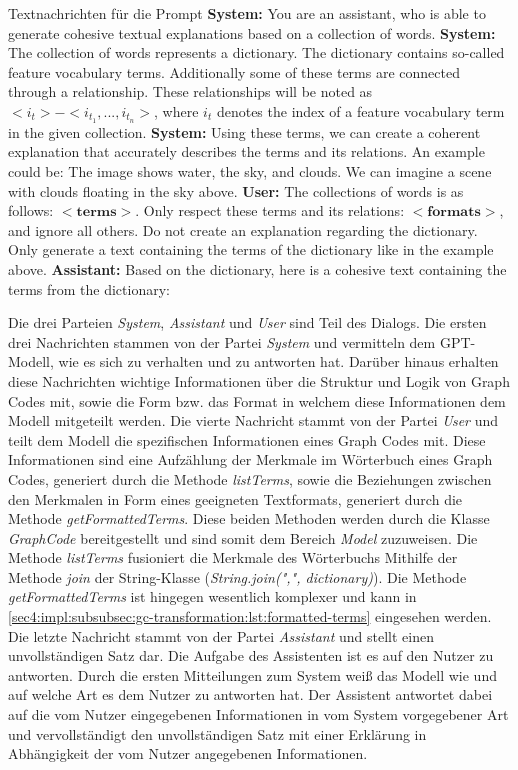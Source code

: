 \begin{messages}[breakable,colbacktitle=white, coltitle=black,label={sec4:impl:subsubsec:gc-transformation:tcb:messages}]{Textnachrichten für die Prompt}
  \textbf{System:} You are an assistant, who is able to generate cohesive textual explanations based on a collection of words.
  \tcbline
  \textbf{System:} The collection of words represents a dictionary.
  The dictionary contains so-called feature vocabulary terms.
  Additionally some of these terms are connected through a relationship.
  These relationships will be noted as $<i_t> - <i_{t_1},...,i_{t_n}>$, where $i_t$ denotes the index of a feature vocabulary term in the given collection.
  \tcbline
  \textbf{System:} Using these terms, we can create a coherent explanation that accurately describes the terms and its relations.
  \med
  An example could be: The image shows water, the sky, and clouds.
  We can imagine a scene with clouds floating in the sky above.
  \tcbline
  \textbf{User:} The collections of words is as follows: $<\textbf{terms}>$.
  Only respect these terms and its relations: $<\textbf{formats}>$, and ignore all others.
  Do not create an explanation regarding the dictionary.
  Only generate a text containing the terms of the dictionary like in the example above.
  \tcbline
  \textbf{Assistant:} Based on the dictionary, here is a cohesive text containing the terms from the dictionary:
\end{messages}

Die drei Parteien \textit{System}, \textit{Assistant} und \textit{User} sind Teil des Dialogs.
Die ersten drei Nachrichten stammen von der Partei \textit{System} und vermitteln dem GPT-Modell, wie es sich zu verhalten und zu antworten hat.
Darüber hinaus erhalten diese Nachrichten wichtige Informationen über die Struktur und Logik von Graph Codes mit, sowie die Form bzw. das Format in welchem diese Informationen dem Modell mitgeteilt werden.
Die vierte Nachricht stammt von der Partei \textit{User} und teilt dem Modell die spezifischen Informationen eines Graph Codes mit.
Diese Informationen sind eine Aufzählung der Merkmale im Wörterbuch eines Graph Codes, generiert durch die Methode \textit{listTerms}, sowie die Beziehungen zwischen den Merkmalen in Form eines geeigneten Textformats, generiert durch die Methode \textit{getFormattedTerms}.
Diese beiden Methoden werden durch die Klasse \textit{GraphCode} bereitgestellt und sind somit dem Bereich \textit{Model} zuzuweisen.
Die Methode \textit{listTerms} fusioniert die Merkmale des Wörterbuchs Mithilfe der Methode \textit{join} der String-Klasse (\textit{String.join(",", dictionary)}).
Die Methode \textit{getFormattedTerms} ist hingegen wesentlich komplexer und kann in \cref{sec4:impl:subsubsec:gc-transformation:lst:formatted-terms} eingesehen werden.
Die letzte Nachricht stammt von der Partei \textit{Assistant} und stellt einen unvollständigen Satz dar.
Die Aufgabe des Assistenten ist es auf den Nutzer zu antworten.
Durch die ersten Mitteilungen zum System weiß das Modell wie und auf welche Art es dem Nutzer zu antworten hat.
Der Assistent antwortet dabei auf die vom Nutzer eingegebenen Informationen in vom System vorgegebener Art und vervollständigt den unvollständigen Satz mit einer Erklärung in Abhängigkeit der vom Nutzer angegebenen Informationen.

